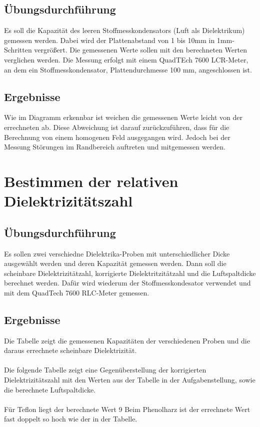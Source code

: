 \documentclass[a4paper,twoside,12pt,DIV=13,BCOR=5mm,numbers=noenddot,cleardoublepage=empty]{scrbook}
\begin{document}
    \subsection{\"Ubungsdurchf\"uhrung}
    Es soll die Kapazit\"at des leeren Stoffmesskondensators (Luft als Dielektrikum) gemessen werden. Dabei wird der Plattenabstand von 1 bis 10mm in 1mm-Schritten vergr\"o\ss{}ert. Die gemessenen Werte sollen mit den berechneten Werten verglichen werden.
    Die Messung erfolgt mit einem QuadTEch 7600 LCR-Meter, an dem ein Stoffmesskondensator, Plattendurchmesse 100 mm, angeschlossen ist.
    \subsection{Ergebnisse}
    Wie im Diagramm erkennbar ist weichen die gemessenen Werte leicht von der errechneten ab. Diese Abweichung ist darauf zur\"uckzuf\"uhren, dass f\"ur die Berechnung von einem homogenen Feld ausgegangen wird. Jedoch bei der Messung St\"orungen im Randbereich auftreten und mitgemessen werden.
    \section{Bestimmen der relativen Dielektrizit\"atszahl}
    \subsection{\"Ubungsdurchf\"uhrung}
    Es sollen zwei verschiedne Dielektrika-Proben mit unterschiedlicher Dicke ausgew\"ahlt werden und deren Kapazit\"at gemessen werden. Dann soll die scheinbare Dielektrizit\"atzahl, korrigierte Dielektritzit\"atzahl und die Luftspaltdicke berechnet werden.
    Daf\"ur wird wiederum der Stoffmesskondesator verwendet und mit dem QuadTech 7600 RLC-Meter gemessen.
    \subsection{Ergebnisse}
    Die Tabelle zeigt die gemessenen Kapazit\"aten der verschiedenen Proben und die daraus errechnete scheinbare Dielektrizit\"at.
    \\
    \\
    Die folgende Tabelle zeigt eine Gegen\"uberstellung der korrigierten Dielektrizit\"atszahl mit den Werten aus der Tabelle in der Aufgabenstellung, sowie die berechnete Luftspaltdicke.
    \\
    \\
    F\"ur Teflon liegt der berechnete Wert 9%
    Beim Phenolharz ist der errechnete Wert fast doppelt so hoch wie der in der Tabelle. 
    
\end{document}

